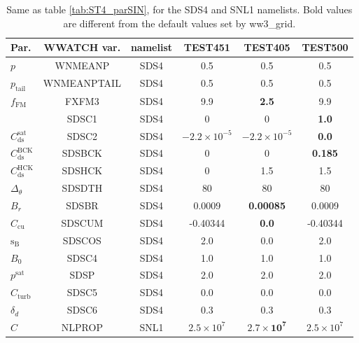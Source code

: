 \begin{table} \begin{center} {\small
\begin{tabular}{|l|c|c|c|c|c|} \hline \hline
Par.         &  WWATCH var. & namelist & TEST451 & TEST405  & TEST500 \\
\hline
  $p$                               &  WNMEANP        & SDS4 & 0.5                   & 0.5 &  0.5    \\
  $p_{\mathrm{tail}}$               &  WNMEANPTAIL    & SDS4 & 0.5                   & 0.5 &  0.5 \\
  $f_{\mathrm{FM}}$                 &  FXFM3          & SDS4 & 9.9                   & \textbf{2.5} &  9.9  \\
                                    & SDSC1           & SDS4 & 0   & 0                              & \textbf{1.0} \\
  $C_{\mathrm{ds}}^{\mathrm{sat}}$  & SDSC2           & SDS4 & $-2.2\times 10^{-5}$  & $-2.2\times 10^{-5}$  & \textbf{0.0} \\
  $C_{\mathrm{ds}}^{\mathrm{BCK}}$  & SDSBCK          & SDS4 & 0                     & 0  & \textbf{0.185} \\
  $C_{\mathrm{ds}}^{\mathrm{HCK}}$  & SDSHCK           & SDS4 & 0                    & 1.5  & 1.5 \\
  $\Delta_\theta$                   &  SDSDTH         & SDS4 & 80                    & 80 &  80 \\
  $B_r$                             &  SDSBR          & SDS4 & 0.0009                & \textbf{0.00085} & 0.0009    \\
  $C_{\mathrm{cu}}$                 & SDSCUM         & SDS4 & -0.40344               & \textbf{0.0}    & -0.40344     \\
  ${\mathrm{s_B}}$                  & SDSCOS           &SDS4 & 2.0                   &  0.0 & 2.0 \\
   $B_0$                             &  SDSC4          & SDS4 & 1.0                  & 1.0 & 1.0   \\
  $p^{\mathrm{sat}}$                &  SDSP           & SDS4 & 2.0  & 2.0 &  2.0   \\
  $C_{\mathrm{turb}}$               & SDSC5           & SDS4  & 0.0 & 0.0 &  0.0   \\
  $\delta_d$                        & SDSC6           & SDS4  & 0.3 & 0.3 &  0.3   \\
  $C$                               & NLPROP          & SNL1  & $2.5\times 10^7$ & $\mathbf{2.7\times 10^7}$  & $2.5\times 10^7$   \\
 \hline \hline
\end{tabular} } \end{center}

\caption{Same as table \ref{tab:ST4_parSIN}, for the SDS4 and SNL1
namelists. Bold values are different from the default values set by 
 ww3\_grid.} \label{tab:ST4_parSDS}
\end{table}

